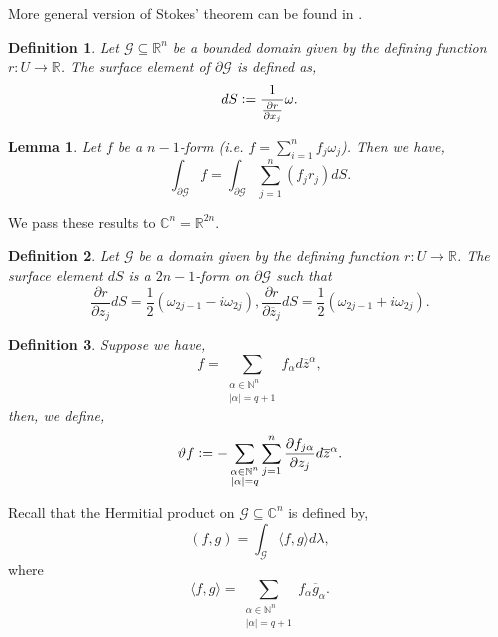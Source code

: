 \documentclass{article}
\newtheorem{definition}{Definition}[section]
\newtheorem{lemma}{Lemma}[section]
\newcommand{\defeq}{\vcentcolon=}
\newcommand{\N}[0]{\mathbb{N}}
\newcommand{\R}[0]{\mathbb{R}}
\newcommand{\C}[0]{\mathbb{C}}
\newcommand{\G}[0]{\mathcal{G}}
\newcommand{\pd}[2]{{\frac {\partial#1} {\partial#2}}}
\newcommand{\bd}[0]{\partial}
\begin{document}
  More general version of Stokes' theorem can be found in \cite{Li-Gr}.
  \begin{definition}
    Let $\G\subseteq\R^n$ be a bounded domain given by the defining function $r:U\to \R$. The surface element of $\bd\G$ is defined as,
    \begin{equation*}
      dS\defeq {\frac 1 {\pd{r}{x_j}}}\omega.
    \end{equation*}
  \end{definition}
  \begin{lemma}
    Let $f$ be a $n-1$-form (i.e. $f=\sum_{i=1}^nf_j\omega_j$). Then we have,
    \begin{equation*}
      \int_{\bd\G}f = \int_{\bd\G}\sum_{j=1}^n (f_jr_j)dS.
    \end{equation*}
  \end{lemma}
  We pass these results to $\C^n=\R^{2n}$. 
  \begin{definition}
    Let $\G$ be a domain given by the defining function $r:U\to \R$. The surface element $dS$ is a $2n-1$-form on $\bd\G$ such that 
    \begin{equation*}
      \pd{r}{z_j}dS = {\frac 1 2}(\omega_{2j-1}-i\omega_{2j}),\pd{r}{\overline{z}_j}dS = {\frac 1 2}(\omega_{2j-1}+i\omega_{2j}).
    \end{equation*}
  \end{definition}
  \begin{definition}
    Suppose we have,
    \begin{equation*}
    f = \sum_{\substack{\alpha\in\N^n\\ \vert\alpha\vert=q+1}}f_\alpha d\overline{z}^\alpha,
  \end{equation*}
  then, we define,
  \begin{equation*}
    \vartheta f \defeq -\sum_{\substack{\alpha\in\N^n\\ \vert\alpha\vert=q}}\sum_{j=1}^n\pd{f_{j\alpha}}{z_j}d\overline{z}^\alpha.
  \end{equation*}
  \end{definition}
  
  Recall that the Hermitial product on $\G\subseteq\C^n$ is defined by,
  \begin{equation*}
    (f,g) = \int_{\G}\langle f,g\rangle d\lambda,
  \end{equation*}
  where 
  \begin{equation*}
    \langle f,g\rangle = \sum_{\substack{\alpha\in\N^n\\ \vert\alpha\vert=q+1}}f_\alpha\overline{g}_\alpha.
  \end{equation*}
\end{document}
